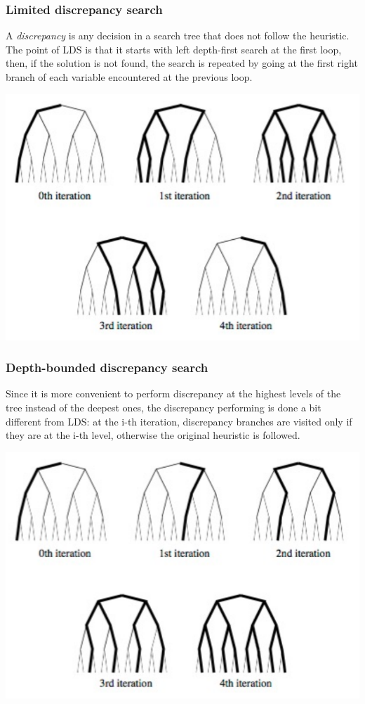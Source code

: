\documentclass[10pt,a4paper]{article}
\begin{document}
\subsubsection{Limited discrepancy search}
A \textit{discrepancy} is any decision in a search tree that does not follow the
heuristic. The point of LDS is that it starts with left depth-first search at
the first loop, then, if the solution is not found, the search is repeated by
going at the first right branch of each variable encountered at the previous
loop.

\includegraphics[scale=0.25]{lds.png}

\subsubsection{Depth-bounded discrepancy search}
Since it is more convenient to perform discrepancy at the highest levels of the
tree instead of the deepest ones, the discrepancy performing is done a bit
different from LDS: at the i-th iteration, discrepancy branches are visited only
if they are at the i-th level, otherwise the original heuristic is followed.

\includegraphics[scale=0.25]{dds.png}
\end{document}
